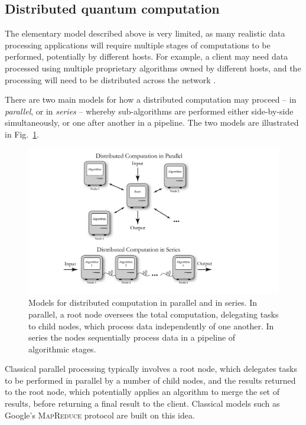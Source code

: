 \documentclass[aps, rmp, twocolumn, amsmath, amssymb, nofootinbib, superscriptaddress, longbibliography, floatfix, table-of-contents, eqsecnum]{revtex4-1}
\begin{document}
%
%

\subsection{Distributed quantum computation} \label{sec:dist_QC} 

The elementary model described above is very limited, as many realistic data processing applications will require multiple stages of computations to be performed, potentially by different hosts. For example, a client may need data processed using multiple proprietary algorithms owned by different hosts, and the processing will need to be distributed across the network \cite{bib:Cirac99}.

There are two main models for how a distributed computation may proceed -- in \textit{parallel}, or in \textit{series} -- whereby sub-algorithms are performed either side-by-side simultaneously, or one after another in a pipeline. The two models are illustrated in Fig.~\ref{fig:distributed}.

\begin{figure}[!htb]
\includegraphics[width=\columnwidth]{distributed}
\caption{Models for distributed computation in parallel and in series. In parallel, a root node oversees the total computation, delegating tasks to child nodes, which process data independently of one another. In series the nodes sequentially process data in a pipeline of algorithmic stages.} \label{fig:distributed}
\end{figure}

Classical parallel processing typically involves a root node, which delegates tasks to be performed in parallel by a number of child nodes, and the results returned to the root node, which potentially applies an algorithm to merge the set of results, before returning a final result to the client. Classical models such as Google's \textsc{MapReduce} protocol \cite{bib:MapReduce} are built on this idea.
\end{document}
